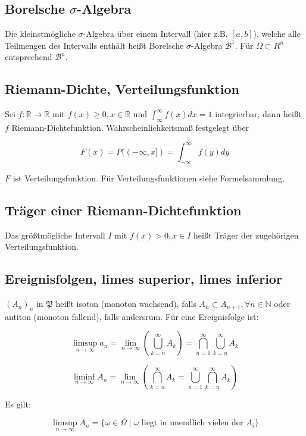 \documentclass{scrartcl}%
\begin{document}
\subsection{Borelsche $\sigma$-Algebra}
Die kleinstmögliche $\sigma$-Algebra über einem Intervall (hier z.B. $[a,b]$), welche alle Teilmengen des Intervalls enthält heißt Borelsche $\sigma$-Algebra $\mathcal{B}^1$. Für $\Omega \subset R^n$ entsprechend $\mathcal{B}^n$.

\subsection{Riemann-Dichte, Verteilungsfunktion}
Sei $f: \mathbb{R} \rightarrow \mathbb{R}$ mit $f(x) \geq 0, x \in \mathbb{R}$ und $\int_{\infty}^{\infty} f(x) dx = 1$ integrierbar, dann heißt $f$ Riemann-Dichtefunktion. Wahrscheinlichkeitsmaß festgelegt über

\[F(x) = P((-\infty,x]) = \int_{-\infty}^{\infty} f(y) dy\]

$F$ ist Verteilungsfunktion. Für Verteilungsfunktionen siehe Formelsammlung.

\subsection{Träger einer Riemann-Dichtefunktion}
Das größtmögliche Intervall $I$ mit $f(x) > 0, x \in I$ heißt Träger der zugehörigen Verteilungsfunktion.

\subsection{Ereignisfolgen, limes superior, limes inferior}

$(A_n)_n$ in $\mathfrak{P}$ heißt isoton (monoton wachsend), falls $A_n \subset A_{n+1}, \forall n \in \mathbb{N}$ oder antiton (monoton fallend), falls andersrum. Für eine Ereignisfolge ist:

\[\limsup\limits_{n \rightarrow \infty}{a_n} = \lim\limits_{n \rightarrow \infty} (\bigcup\limits_{k=n}^{\infty} A_k) = \bigcap\limits_{n=1}^{\infty} \bigcup\limits_{k=n}^{\infty} A_k\]

\[\liminf\limits_{n \rightarrow \infty} A_n = \lim\limits_{n \rightarrow \infty} (\bigcap\limits_{k=n}^\infty A_k = \bigcup\limits_{n=1}^\infty \bigcap\limits_{k=n}^\infty A_k)\]

Es gilt: 


\[\limsup\limits_{n \rightarrow \infty} A_n = \{\omega \in \Omega \mid \omega \textrm{ liegt in unendlich vielen der } A_i\} \]
\end{document}
